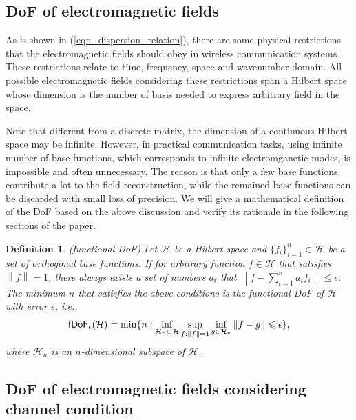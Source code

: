 \documentclass[12pt,draftclsnofoot,journal,onecolumn]{IEEEtran}
\newtheorem{definition}{Definition}
\begin{document}
{\color{red}
\subsection{DoF of electromagnetic fields}

As is shown in (\ref{eqn_dispersion_relation}), there are some physical restrictions that the electromagnetic fields should obey in wireless communication systems. These restrictions relate to time, frequency, space and wavenumber domain. All possible electromagnetic fields considering these restrictions span a Hilbert space whose dimension is the number of basis needed to express arbitrary field in the space. 

Note that different from a discrete matrix, the dimension of a continuous Hilbert space may be infinite. However, in practical communication tasks, using infinite number of base functions, which corresponds to infinite electromganetic modes, is impossible and often unnecessary. The reason is that only a few base functions contribute a lot to the field reconstruction, while the remained base functions can be discarded with small loss of precision. We will give a mathematical definition of the DoF based on the above discussion and verify its rationale in the following sections of the paper. 
}

\begin{definition}
		(functional DoF) Let $\mathcal{H}$ be a Hilbert space and $\{f_i\}_{i=1}^n \in \mathcal{H}$ be a set of orthogonal base functions. If for arbitrary function $f \in \mathcal{H}$ that satisfies $\left\| f \right\|=1$, there always exists a set of numbers $a_i$ that 
		$\left\| f-\sum_{i=1}^n a_i f_i  \right\| \leqslant \epsilon$. The minimum $n$ that satisfies the above conditions is the functional DoF of $\mathcal{H}$ with error $\epsilon$, i.e.,
		\begin{equation}
			\mathsf{fDoF}_{\epsilon} (\mathcal{H}) = {\rm min}\{ n: \underset{\mathcal{H}_n \subset \mathcal{H}}{\rm inf} \sup_{f: \left\| f \right\|=1} \inf_{g \in \mathcal{H}_n} \left\| f-g \right\| \leqslant \epsilon  \},
		\end{equation}
		where $\mathcal{H}_n$ is an $n$-dimensional subspace of $\mathcal{H}$.
	\end{definition}

\subsection{\color{red}DoF of electromagnetic fields considering channel condition}
\end{document}
